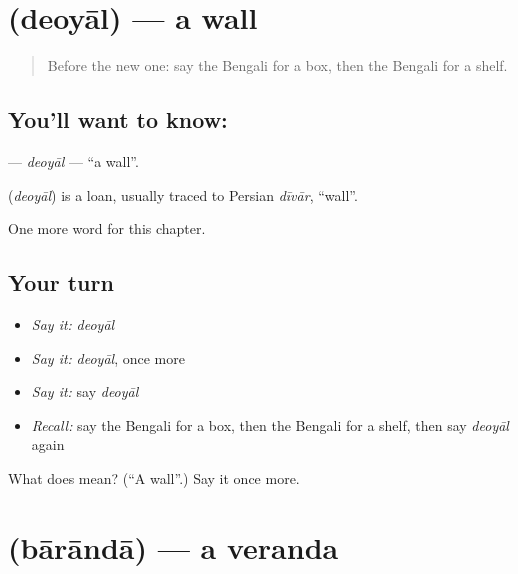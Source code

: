 \section[\texorpdfstring{\bn{দেওয়াল} (deoyāl)}{দেওয়াল (deoyāl)}]{ (deoyāl) — a wall}

\label{lesson:BN-C112-deoyal}



\begin{quote}
Before the new one: say the Bengali for a box, then the Bengali for a shelf.
\end{quote}

\subsection*{You'll want to know: }
\textbf{} — \emph{deoyāl} — \textquotedblleft{}a wall\textquotedblright{}.

\begin{cousinweb}
\textbf{} (\emph{deoyāl}) is a loan, usually traced to Persian \emph{dīvār}, \textquotedblleft{}wall\textquotedblright{}.
\end{cousinweb}

\begin{grammarlens}[title={What you've built}]
One more word for this chapter.
\end{grammarlens}

\subsection*{Your turn}
\begin{itemize}
\raggedright
  \item \emph{Say it:} \emph{deoyāl}
  \item \emph{Say it:} \emph{deoyāl}, once more
  \item \emph{Say it:} say \emph{deoyāl}
  \item \emph{Recall:} say the Bengali for a box, then the Bengali for a shelf, then say \emph{deoyāl} again
\end{itemize}

\begin{tcolorbox}[breakable,colback=teal!4,colframe=teal!35!black,title={Before you move on}]
What does  mean? (\textquotedblleft{}A wall\textquotedblright{}.) Say it once more.
\end{tcolorbox}
\section[\texorpdfstring{\bn{বারান্দা} (bārāndā)}{বারান্দা (bārāndā)}]{ (bārāndā) — a veranda}

